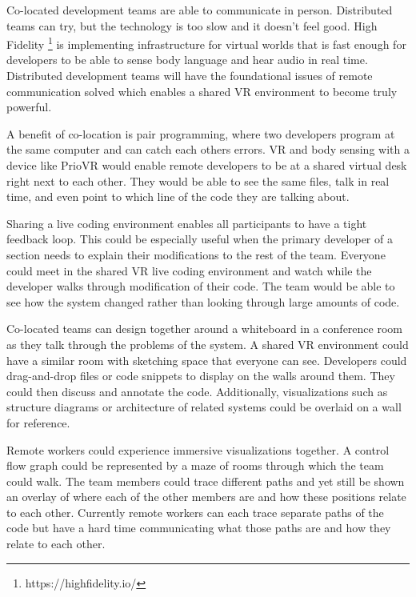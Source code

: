 \documentclass[conference]{IEEEtran}
\begin{document}

Co-located development teams are able to communicate in person. 
Distributed teams can try, but the technology is too slow and it doesn't feel good. 
High Fidelity \footnote{https://highfidelity.io/} is implementing infrastructure for virtual worlds that is fast enough for developers to be able to sense body language and hear audio in real time.  
Distributed development teams will have the foundational issues of remote communication solved which enables a shared VR environment to become truly powerful.

A benefit of co-location is pair programming, where two developers program at the same computer and can catch each others errors. 
VR and body sensing with a device like PrioVR would enable remote developers to be at a shared virtual desk right next to each other. 
They would be able to see the same files, talk in real time, and even point to which line of the code they are talking about. 

Sharing a live coding environment enables all participants to have a tight feedback loop. 
This could be especially useful when the primary developer of a section needs to explain their modifications to the rest of the team. 
Everyone could meet in the shared VR live coding environment and watch while the developer walks through modification of their code. 
The team would be able to see how the system changed rather than looking through large amounts of code.

Co-located teams can design together around a whiteboard in a conference room as they talk through the problems of the system. 
A shared VR environment could have a similar room with sketching space that everyone can see. 
Developers could drag-and-drop files or code snippets to display on the walls around them. 
They could then discuss and annotate the code. 
Additionally, visualizations such as structure diagrams or architecture of related systems could be overlaid on a wall for reference.

Remote workers could experience immersive visualizations together. 
A control flow graph could be represented by a maze of rooms through which the team could walk. 
The team members could trace different paths and yet still be shown an overlay of where each of the other members are and how these positions relate to each other. 
Currently remote workers can each trace separate paths of the code but have a hard time communicating what those paths are and how they relate to each other.
\end{document}
